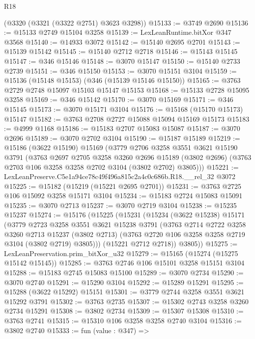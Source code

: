 \begin{lexlean}{R18}
\begin{coremodule}
    (@3320 (@3321 (@3322 @2751) @3623 @3298))
@15133 := @3749 @2690
@15136 := @15133 @2749 @15104 @3258
@15139 := LexLeanRuntime.bitXor @347 @3568
@15140 := @14933 @3072
@15142 := @15140 @2695 @2701
@15143 := @15139 @15142
@15145 := @15140 @2712 @2718
@15146 := @15143 @15145
@15147 := @346 @15146
@15148 := @3070 @15147
@15150 := @15140 @2733 @2739
@15151 := @346 @15150
@15153 := @3070 @15151 @3104
@15159 := @15136 (@15148 @15153) (@346 (@15139 @15146 @15150))
@15165 := @3763 @2729 @2748 @15097 @15103 @15147 @15153
@15168 := @15133 @2728 @15095 @3258
@15169 := @346 @15142
@15170 := @3070 @15169
@15171 := @346 @15145
@15173 := @3070 @15171 @3104
@15176 := @15168 (@15170 @15173) @15147
@15182 := @3763 @2708 @2727 @15088 @15094 @15169 @15173
@15183 := @4999 @1168
@15186 := @15183 @2707 @15083 @15087
@15187 := @3070 @2696
@15189 := @3070 @2702 @3104
@15190 := @15187 @15189
@15219 := @15186
    (@3622 @15190)
    @15169
    (@3779
      @2706
      @3258
      @3551
      @3621
      @15190
      @3791
      (@3763
        @2697
        @2705
        @3258
        @3260
        @2696
        @15189
        (@3802 @2696)
        (@3763 @2703 @106 @3258 @3258 @2702 @3104 (@3802 @2702) @3805)))
@15221 := LexLeanPreserve.C5e1a94ce78c49f496a815c2a4c0c686b.R18.__rel_32 @3072
@15225 := @15182 (@15219 (@15221 @2695 @2701))
@15231 := @3763 @2725 @106 @15092 @3258 @15171 @3104
@15234 := @15183 @2724 @15083 @15091
@15235 := @3070 @2713
@15237 := @3070 @2719 @3104
@15238 := @15235 @15237
@15274 := @15176
    (@15225
      (@15231
        (@15234
          (@3622 @15238)
          @15171
          (@3779
            @2723
            @3258
            @3551
            @3621
            @15238
            @3791
            (@3763
              @2714
              @2722
              @3258
              @3260
              @2713
              @15237
              (@3802 @2713)
              (@3763 @2720 @106 @3258 @3258 @2719 @3104 (@3802 @2719) @3805)))
          (@15221 @2712 @2718))
        @3805))
@15275 := LexLeanPreservation.prim_bitXor_u32
@15279 := @15165 (@15274 (@15275 @15142 @15145))
@15285 := @3763 @2746 @106 @15101 @3258 @15151 @3104
@15288 := @15183 @2745 @15083 @15100
@15289 := @3070 @2734
@15290 := @3070 @2740
@15291 := @15290 @3104
@15292 := @15289 @15291
@15295 := @15288 (@3622 @15292) @15151
@15301 := @3779 @2744 @3258 @3551 @3621 @15292 @3791
@15302 := @3763 @2735
@15307 := @15302 @2743 @3258 @3260 @2734 @15291
@15308 := @3802 @2734
@15309 := @15307 @15308
@15310 := @3763 @2741
@15315 := @15310 @106 @3258 @3258 @2740 @3104
@15316 := @3802 @2740
@15333 := fun (value : @347) =>

\end{coremodule}
\end{lexlean}
